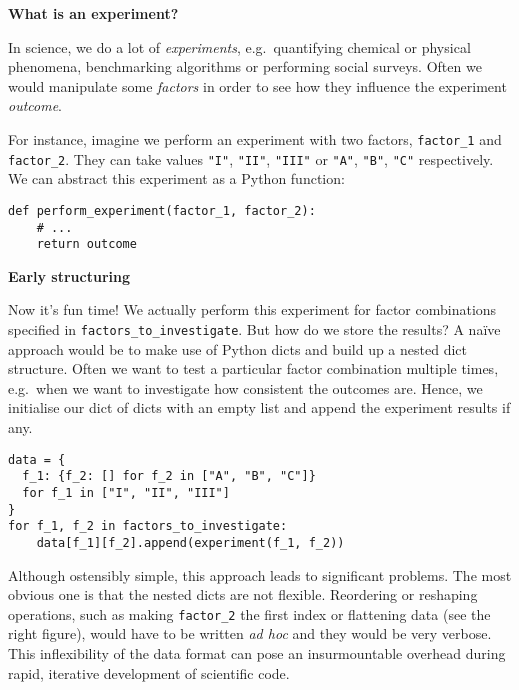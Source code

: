 \textrm{\textbf{What is an experiment?}}
\vspace{6 pt}

In science, we do a lot of \emph{experiments},
e.g.\ quantifying chemical or physical phe\-nomena,
benchmarking algorithms or performing social surveys.
Often we would manipulate some \emph{factors}
in order to see how they influence the experiment \emph{outcome}.

\vspace{3 pt}

For instance, imagine we perform an experiment with two factors,
\lstinline{factor_1} and \lstinline{factor_2}.
They can take values \lstinline{"I"}, \lstinline{"II"}, \lstinline{"III"}
or \lstinline{"A"}, \lstinline{"B"}, \lstinline{"C"} respectively.
We can abstract this experiment as a Python function:

\begin{lstlisting}
def perform_experiment(factor_1, factor_2):
    # ...
    return outcome
\end{lstlisting}

\vspace{-8 pt}

\textrm{\textbf{Early structuring}}
\vspace{6 pt}

Now it's fun time! We actually perform this experiment
for factor combinations specified in \lstinline{factors_to_investigate}.
But how do we store the results?
A naïve approach would be to make use of Python dicts
and build up a nested dict structure.
Often we want to test a particular factor combination multiple times,
e.g.\ when we want to investigate how consistent the outcomes are.
Hence, we initialise our dict of dicts with an empty list
and append the experiment results if any.

\begin{lstlisting}
data = {
  f_1: {f_2: [] for f_2 in ["A", "B", "C"]}
  for f_1 in ["I", "II", "III"]
}
for f_1, f_2 in factors_to_investigate:
    data[f_1][f_2].append(experiment(f_1, f_2))
\end{lstlisting}

\vspace{-22 pt}

Although ostensibly simple, this approach leads to significant problems.
The most obvious one is that the nested dicts are not flexible.
Reordering or reshaping operations,
such as making \lstinline{factor_2} the first index or flattening data (see the right figure),
would have to be written \emph{ad hoc} and they would be very verbose.
This inflexibility of the data format can pose an insurmountable overhead during
rapid, iterative development of scientific code.

